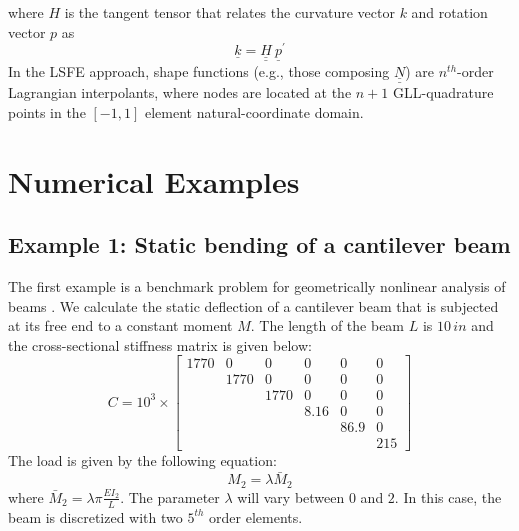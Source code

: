 \documentclass{aiaa-tc}
\newcommand{\tens}[1]{\underline{\underline{#1}}}
\renewcommand{\vec}[1]{\underline{#1}}
\begin{document}
where $H$ is the tangent tensor that relates the curvature vector $k$ and rotation vector $p$ as
\begin{equation}
    \label{Tensor}
    \vec{k} = \tens{H}~ \vec{p}^\prime
\end{equation}
In the LSFE approach, shape functions (e.g., those composing $\tens{N}$) are
$n^{th}$-order Lagrangian interpolants, where nodes are located at the $n+1$
GLL-quadrature points in the $[-1,1]$ element natural-coordinate domain.

\section{Numerical Examples}

\subsection{Example 1: Static bending of a cantilever beam}

The first example is a benchmark problem for geometrically nonlinear
analysis of beams \cite{Simo1985,Xiao2012}. We calculate the static
deflection of a cantilever beam that is subjected at its free end to
a constant moment $M$.  The length of the beam $L$ is $10\,in$ and the cross-sectional stiffness 
matrix is given below:
\begin{equation}
    \label{StifE1}
    C = 10^3 \times \begin{bmatrix}
	1770 & 0    & 0    & 0    & 0    & 0   \\
	     & 1770 & 0    & 0    & 0    & 0   \\
	     &      & 1770 & 0    & 0    & 0   \\
	     &      &      & 8.16 & 0    & 0   \\
	     &      &      &      & 86.9 & 0   \\
	     &      &      &      &      & 215
\end{bmatrix}
\end{equation} 
The load is given by the following equation:
\begin{equation}
    \label{E1Load}
    M_2 = \lambda \bar{M}_2
\end{equation}
where $\bar{M}_2 = \lambda \pi \frac{EI_2}{L}$. The parameter $\lambda$ will vary between $0$ and $2$. In 
this case, the beam is discretized with two $5^{th}$ order elements. 



 



\end{document}
